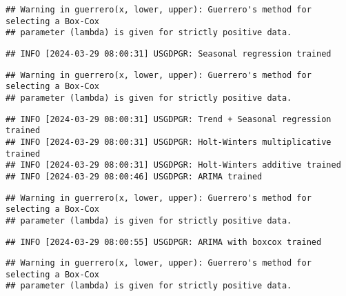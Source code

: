 \documentclass[
]{article}
\begin{document}
\begin{verbatim}
## Warning in guerrero(x, lower, upper): Guerrero's method for selecting a Box-Cox
## parameter (lambda) is given for strictly positive data.
\end{verbatim}

\begin{verbatim}
## INFO [2024-03-29 08:00:31] USGDPGR: Seasonal regression trained
\end{verbatim}

\begin{verbatim}
## Warning in guerrero(x, lower, upper): Guerrero's method for selecting a Box-Cox
## parameter (lambda) is given for strictly positive data.
\end{verbatim}

\begin{verbatim}
## INFO [2024-03-29 08:00:31] USGDPGR: Trend + Seasonal regression trained
## INFO [2024-03-29 08:00:31] USGDPGR: Holt-Winters multiplicative trained
## INFO [2024-03-29 08:00:31] USGDPGR: Holt-Winters additive trained
## INFO [2024-03-29 08:00:46] USGDPGR: ARIMA trained
\end{verbatim}

\begin{verbatim}
## Warning in guerrero(x, lower, upper): Guerrero's method for selecting a Box-Cox
## parameter (lambda) is given for strictly positive data.
\end{verbatim}

\begin{verbatim}
## INFO [2024-03-29 08:00:55] USGDPGR: ARIMA with boxcox trained
\end{verbatim}

\begin{verbatim}
## Warning in guerrero(x, lower, upper): Guerrero's method for selecting a Box-Cox
## parameter (lambda) is given for strictly positive data.
\end{verbatim}
\end{document}
